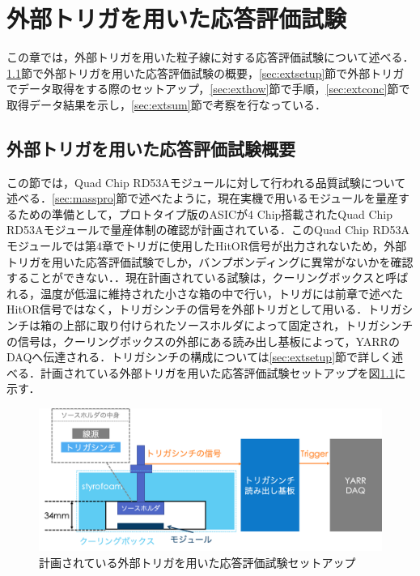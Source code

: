\chapter{外部トリガを用いた応答評価試験}
この章では，外部トリガを用いた粒子線に対する応答評価試験について述べる．\ref{sec:extplan}節で外部トリガを用いた応答評価試験の概要，\ref{sec:extsetup}節で外部トリガでデータ取得をする際のセットアップ，\ref{sec:exthow}節で手順，\ref{sec:extconc}節で取得データ結果を示し，\ref{sec:extsum}節で考察を行なっている．

\section{外部トリガを用いた応答評価試験概要}
\label{sec:extplan}
この節では，Quad Chip RD53Aモジュールに対して行われる品質試験について述べる．\ref{sec:masspro}節で述べたように，現在実機で用いるモジュールを量産するための準備として，プロトタイプ版のASICが4 $\mathrm{Chip}$搭載されたQuad Chip RD53Aモジュールで量産体制の確認が計画されている．このQuad Chip RD53Aモジュールでは第4章でトリガに使用したHitOR信号が出力されないため，外部トリガを用いた応答評価試験でしか，バンプボンディングに異常がないかを確認することができない．．現在計画されている試験は，クーリングボックスと呼ばれる，温度が低温に維持された小さな箱の中で行い，トリガには前章で述べたHitOR信号ではなく，トリガシンチの信号を外部トリガとして用いる．トリガシンチは箱の上部に取り付けられたソースホルダによって固定され，トリガシンチの信号は，クーリングボックスの外部にある読み出し基板によって，YARRのDAQへ伝達される．トリガシンチの構成については\ref{sec:extsetup}節で詳しく述べる．計画されている外部トリガを用いた応答評価試験セットアップを図\ref{fig:trigplan}に示す．

\begin{figure}[h]
  \centering
  \includegraphics[width=15cm]{./figure/trigplan.png}
  \caption{計画されている外部トリガを用いた応答評価試験セットアップ}
  \label{fig:trigplan}
\end{figure}

